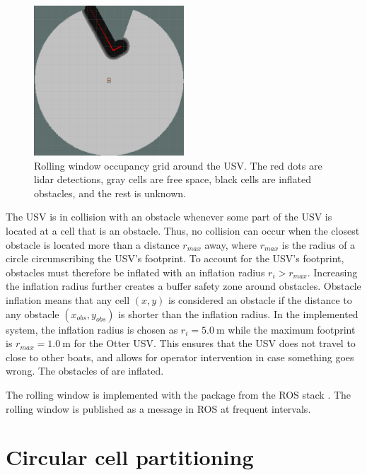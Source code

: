 \begin{figure}[h!]
	\centering
	\includegraphics[width=0.5\textwidth]{fig/partition/costmap}
	\caption[Rolling window occupancy grid around the USV.]{Rolling window occupancy grid around the USV. The red dots are lidar detections, gray cells are free space, black cells are inflated obstacles, and the rest is unknown.}
	\label{fig:costmap}
\end{figure}

The USV is in collision with an obstacle whenever some part of the USV is located at a cell that is an obstacle. Thus, no collision can occur when the closest obstacle is located more than a distance $r_{max}$ away, where $r_{max}$ is the radius of a circle circumscribing the USV's footprint. To account for the USV's footprint, obstacles must therefore be inflated with an inflation radius $r_i > r_{max}$. Increasing the inflation radius further creates a buffer safety zone around obstacles. Obstacle inflation means that any cell $(x,y)$ is considered an obstacle if the distance to any obstacle $(x_{obs},y_{obs})$ is shorter than the inflation radius. In the implemented system, the inflation radius is chosen as $r_i = \SI{5.0}{\meter}$ while the maximum footprint is $r_{max} = \SI{1.0}{\meter}$ for the Otter USV. This ensures that the USV does not travel to close to other boats, and allows for operator intervention in case something goes wrong. The obstacles of  are inflated.

The rolling window is implemented with the  package from the ROS  stack \citep{marder2010office}. The rolling window is published as a  message in ROS at frequent intervals.


\section{Circular cell partitioning} \label{sec:circle_partition}

